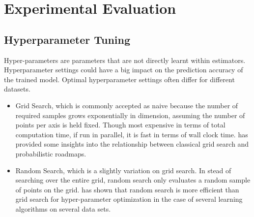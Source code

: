 \documentclass{standalone}
\begin{document}
\section{Experimental Evaluation}\label{evam}

\subsection{Hyperparameter Tuning}

Hyper-parameters are parameters that are not directly learnt within estimators. Hyperparameter settings could have a big impact on the prediction accuracy of the trained model. Optimal hyperparameter settings often differ for different datasets\cite{Alice:2015:Evaluating}.

\begin{itemize}
    \item Grid Search, which is commonly accepted as naive
because the number of required samples grows exponentially
in dimension, assuming the number of points per axis is held fixed. Though most expensive in terms of total computation time, if run in parallel, it is fast in terms of wall clock time.
\cite{lavalle2004relationship} has provided some insights into the relationship between
classical grid search and probabilistic roadmaps.

\item Random Search, which is a slightly variation on grid search. In stead of searching over the entire grid, random search only evaluates a random sample of points on the grid.
\cite{bergstra2012random} has shown that random search is  more efficient than grid search for hyper-parameter optimization
in the case of several learning algorithms on several data sets.
\end{itemize}
\end{document}
